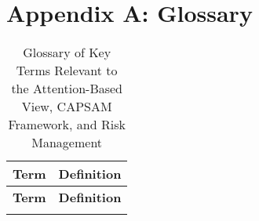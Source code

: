 \section*{Appendix A: Glossary}

\renewcommand{\arraystretch}{1.3}
\begin{longtable}{|>{\raggedright}m{4cm}|m{10cm}|}
    \caption{Glossary of Key Terms Relevant to the Attention-Based View, CAPSAM Framework, and Risk Management}
    \label{tab:Glossary} \\
    \hline
    \textbf{Term} & \textbf{Definition} \\ \hline\hline
    \endfirsthead
    \hline
    \textbf{Term} & \textbf{Definition} \\ \hline
    \endhead
    \hline
    \endfoot
    \hline
    \endlastfoot


\end{longtable}
